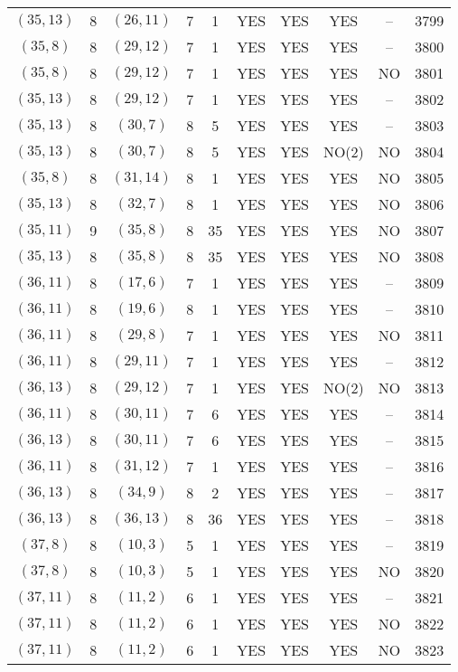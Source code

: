 \begin{longtable}{|c|c|c|c|c|c|c|c|c|c|}
$(35, 13)$ & 8 & $(26, 11)$ & 7 & 1 & YES & YES & YES & -- & 3799\\
$(35, 8)$ & 8 & $(29, 12)$ & 7 & 1 & YES & YES & YES & -- & 3800\\
$(35, 8)$ & 8 & $(29, 12)$ & 7 & 1 & YES & YES & YES & NO & 3801\\
$(35, 13)$ & 8 & $(29, 12)$ & 7 & 1 & YES & YES & YES & -- & 3802\\
$(35, 13)$ & 8 & $(30, 7)$ & 8 & 5 & YES & YES & YES & -- & 3803\\
$(35, 13)$ & 8 & $(30, 7)$ & 8 & 5 & YES & YES & NO(2) & NO & 3804\\
$(35, 8)$ & 8 & $(31, 14)$ & 8 & 1 & YES & YES & YES & NO & 3805\\
$(35, 13)$ & 8 & $(32, 7)$ & 8 & 1 & YES & YES & YES & NO & 3806\\
$(35, 11)$ & 9 & $(35, 8)$ & 8 & 35 & YES & YES & YES & NO & 3807\\
$(35, 13)$ & 8 & $(35, 8)$ & 8 & 35 & YES & YES & YES & NO & 3808\\
$(36, 11)$ & 8 & $(17, 6)$ & 7 & 1 & YES & YES & YES & -- & 3809\\
$(36, 11)$ & 8 & $(19, 6)$ & 8 & 1 & YES & YES & YES & -- & 3810\\
$(36, 11)$ & 8 & $(29, 8)$ & 7 & 1 & YES & YES & YES & NO & 3811\\
$(36, 11)$ & 8 & $(29, 11)$ & 7 & 1 & YES & YES & YES & -- & 3812\\
$(36, 13)$ & 8 & $(29, 12)$ & 7 & 1 & YES & YES & NO(2) & NO & 3813\\
$(36, 11)$ & 8 & $(30, 11)$ & 7 & 6 & YES & YES & YES & -- & 3814\\
$(36, 13)$ & 8 & $(30, 11)$ & 7 & 6 & YES & YES & YES & -- & 3815\\
$(36, 11)$ & 8 & $(31, 12)$ & 7 & 1 & YES & YES & YES & -- & 3816\\
$(36, 13)$ & 8 & $(34, 9)$ & 8 & 2 & YES & YES & YES & -- & 3817\\
$(36, 13)$ & 8 & $(36, 13)$ & 8 & 36 & YES & YES & YES & -- & 3818\\
$(37, 8)$ & 8 & $(10, 3)$ & 5 & 1 & YES & YES & YES & -- & 3819\\
$(37, 8)$ & 8 & $(10, 3)$ & 5 & 1 & YES & YES & YES & NO & 3820\\
$(37, 11)$ & 8 & $(11, 2)$ & 6 & 1 & YES & YES & YES & -- & 3821\\
$(37, 11)$ & 8 & $(11, 2)$ & 6 & 1 & YES & YES & YES & NO & 3822\\
$(37, 11)$ & 8 & $(11, 2)$ & 6 & 1 & YES & YES & YES & NO & 3823\\

\end{longtable}
